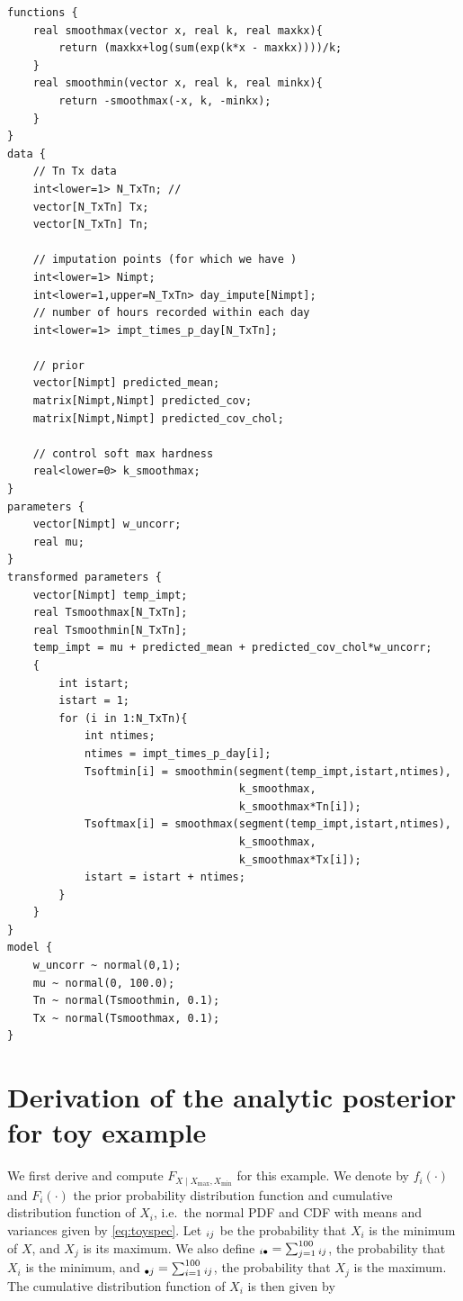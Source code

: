 \documentclass[letter]{article}
\let\Pr\relax
\DeclareMathOperator{\Pr}{\mathbb{P}}
\newcommand{\Xmax}{X_{\max}}
\newcommand{\Xmin}{X_{\min}}
\newcommand{\Fcond}{F_{X \mid \Xmax,\Xmin}}
\newcommand{\pxx}[2]{\Pr{}_{#1#2}}
\newcommand{\pij}{\pxx{i}{j}}
\newcommand{\pisum}{\pxx{i}{\bullet}}
\newcommand{\psumj}{\pxx{\bullet}{j}}
\begin{document}
\label{sec:appendix_stan}
        \begin{verbatim}
functions {
    real smoothmax(vector x, real k, real maxkx){
        return (maxkx+log(sum(exp(k*x - maxkx))))/k;
    }
    real smoothmin(vector x, real k, real minkx){
        return -smoothmax(-x, k, -minkx);
    }
}
data {
    // Tn Tx data
    int<lower=1> N_TxTn; //
    vector[N_TxTn] Tx;
    vector[N_TxTn] Tn;

    // imputation points (for which we have )
    int<lower=1> Nimpt;
    int<lower=1,upper=N_TxTn> day_impute[Nimpt];
    // number of hours recorded within each day
    int<lower=1> impt_times_p_day[N_TxTn];

    // prior 
    vector[Nimpt] predicted_mean;
    matrix[Nimpt,Nimpt] predicted_cov;
    matrix[Nimpt,Nimpt] predicted_cov_chol;

    // control soft max hardness
    real<lower=0> k_smoothmax;
}
parameters {
    vector[Nimpt] w_uncorr;
    real mu;
}
transformed parameters {
    vector[Nimpt] temp_impt;
    real Tsmoothmax[N_TxTn];
    real Tsmoothmin[N_TxTn];  
    temp_impt = mu + predicted_mean + predicted_cov_chol*w_uncorr;
    {
        int istart;
        istart = 1;
        for (i in 1:N_TxTn){
            int ntimes;
            ntimes = impt_times_p_day[i];
            Tsoftmin[i] = smoothmin(segment(temp_impt,istart,ntimes), 
                                    k_smoothmax, 
                                    k_smoothmax*Tn[i]);
            Tsoftmax[i] = smoothmax(segment(temp_impt,istart,ntimes), 
                                    k_smoothmax,
                                    k_smoothmax*Tx[i]);
            istart = istart + ntimes;
        }
    }
}
model {
    w_uncorr ~ normal(0,1);
    mu ~ normal(0, 100.0);
    Tn ~ normal(Tsmoothmin, 0.1);
    Tx ~ normal(Tsmoothmax, 0.1);
}
\end{verbatim}
    


        \section{Derivation of the analytic posterior for toy example}\label{derivation-of-the-analytic-posterior-for-toy-example}
    

\label{sec:analytical_posterior}
        We first derive and compute \(\Fcond\) for this example.
We denote by \(f_i(\cdot)\) and \(F_i(\cdot)\) the prior probability distribution function and cumulative distribution function of \(X_i\), i.e.~the normal PDF and CDF with means and variances given by \eqref{eq:toyspec}.
Let \(\pij\) be the probability that \(X_i\) is the minimum of \(X\), and \(X_j\) is its maximum.
We also define \(\pisum = \sum_{j=1}^{100} \pij\), the probability that \(X_i\) is the minimum,
and \(\psumj = \sum_{i=1}^{100} \pij\), the probability that \(X_j\) is the maximum.
The cumulative distribution function of \(X_i\) is then given by
\end{document}
